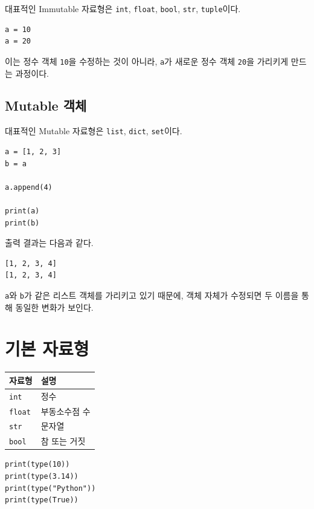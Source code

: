 \documentclass[11pt,a4paper]{article}
\begin{document}
대표적인 Immutable 자료형은 \texttt{int}, \texttt{float}, \texttt{bool}, \texttt{str}, \texttt{tuple}이다.

\begin{lstlisting}
a = 10
a = 20
\end{lstlisting}

이는 정수 객체 \texttt{10}을 수정하는 것이 아니라, \texttt{a}가 새로운 정수 객체 \texttt{20}을 가리키게 만드는 과정이다.

\subsection{Mutable 객체}

대표적인 Mutable 자료형은 \texttt{list}, \texttt{dict}, \texttt{set}이다.

\begin{lstlisting}
a = [1, 2, 3]
b = a

a.append(4)

print(a)
print(b)
\end{lstlisting}

출력 결과는 다음과 같다.

\begin{verbatim}
[1, 2, 3, 4]
[1, 2, 3, 4]
\end{verbatim}

\texttt{a}와 \texttt{b}가 같은 리스트 객체를 가리키고 있기 때문에, 객체 자체가 수정되면 두 이름을 통해 동일한 변화가 보인다.

\section{기본 자료형}

\begin{center}
\begin{tabular}{ll}
\toprule
자료형 & 설명 \\
\midrule
\texttt{int} & 정수 \\
\texttt{float} & 부동소수점 수 \\
\texttt{str} & 문자열 \\
\texttt{bool} & 참 또는 거짓 \\
\bottomrule
\end{tabular}
\end{center}

\begin{lstlisting}
print(type(10))
print(type(3.14))
print(type("Python"))
print(type(True))
\end{lstlisting}
\end{document}
